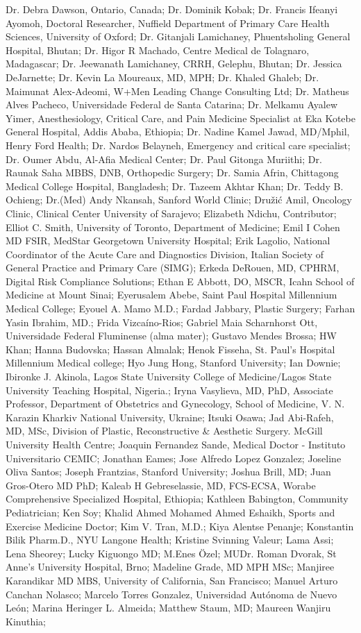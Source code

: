 Dr. Debra Dawson, Ontario, Canada; Dr. Dominik Kobak; Dr. Francis Ifeanyi Ayomoh, Doctoral Researcher, Nuffield Department of Primary Care Health Sciences, University of Oxford; Dr. Gitanjali Lamichaney, Phuentsholing General Hospital, Bhutan; Dr. Higor R Machado, Centre Medical de Tolagnaro, Madagascar; Dr. Jeewanath Lamichaney, CRRH, Gelephu, Bhutan; Dr. Jessica DeJarnette; Dr. Kevin La Moureaux, MD, MPH; Dr. Khaled Ghaleb; Dr. Maimunat Alex-Adeomi, W+Men Leading Change Consulting Ltd; Dr. Matheus Alves Pacheco, Universidade Federal de Santa Catarina; Dr. Melkamu Ayalew Yimer, Anesthesiology, Critical Care, and Pain Medicine Specialist at Eka Kotebe General Hospital, Addis Ababa, Ethiopia; Dr. Nadine Kamel Jawad, MD/Mphil, Henry Ford Health; Dr. Nardos Belayneh, Emergency and critical care specialist; Dr. Oumer Abdu, Al-Afia Medical Center; Dr. Paul Gitonga Muriithi; Dr. Raunak Saha MBBS, DNB, Orthopedic Surgery; Dr. Samia Afrin, Chittagong Medical College Hospital, Bangladesh; Dr. Tazeem Akhtar Khan; Dr. Teddy B. Ochieng; Dr.(Med) Andy Nkansah, Sanford World Clinic; Družić Amil, Oncology Clinic, Clinical Center University of Sarajevo; Elizabeth Ndichu, Contributor; Elliot C. Smith, University of Toronto, Department of Medicine; Emil I Cohen MD FSIR, MedStar Georgetown University Hospital; Erik Lagolio, National Coordinator of the Acute Care and Diagnostics Division, Italian Society of General Practice and Primary Care (SIMG); Erkeda DeRouen, MD, CPHRM, Digital Risk Compliance Solutions; Ethan E Abbott, DO, MSCR, Icahn School of Medicine at Mount Sinai; Eyerusalem Abebe, Saint Paul Hospital Millennium Medical College; Eyouel A. Mamo M.D.; Fardad Jabbary, Plastic Surgery; Farhan Yasin Ibrahim, MD.; Frida Vizcaíno-Rios; Gabriel Maia Scharnhorst Ott, Universidade Federal Fluminense (alma mater); Gustavo Mendes Brossa; HW Khan; Hanna Budovska; Hassan Almalak; Henok Fisseha, St. Paul's Hospital Millennium Medical college; Hyo Jung Hong, Stanford University; Ian Downie; Ibironke J. Akinola, Lagos State University College of Medicine/Lagos State University Teaching Hospital, Nigeria.; Iryna Vasylieva, MD, PhD, Associate Professor, Department of Obstetrics and Gynecology, School of Medicine, V. N. Karazin Kharkiv National University, Ukraine; Itsuki Osawa; Jad Abi-Rafeh, MD, MSc, Division of Plastic, Reconstructive \& Aesthetic Surgery. McGill University Health Centre; Joaquin Fernandez Sande, Medical Doctor - Instituto Universitario CEMIC; Jonathan Eames; Jose Alfredo Lopez Gonzalez; Joseline Oliva Santos; Joseph Frantzias, Stanford University; Joshua Brill, MD; Juan Gros-Otero MD PhD; Kaleab H Gebreselassie, MD, FCS-ECSA, Worabe Comprehensive Specialized Hospital, Ethiopia; Kathleen Babington, Community Pediatrician; Ken Soy; Khalid Ahmed Mohamed Ahmed Eshaikh, Sports and Exercise Medicine Doctor; Kim V. Tran, M.D.; Kiya Alentse Penanje; Konstantin Bilik Pharm.D., NYU Langone Health; Kristine Svinning Valeur; Lama Assi; Lena Sheorey; Lucky Kiguongo MD; M.Enes Özel; MUDr. Roman Dvorak, St Anne's University Hospital, Brno; Madeline Grade, MD MPH MSc; Manjiree Karandikar MD MBS, University of California, San Francisco; Manuel Arturo Canchan Nolasco; Marcelo Torres Gonzalez, Universidad Autónoma de Nuevo León; Marina Heringer L. Almeida; Matthew Staum, MD; Maureen Wanjiru Kinuthia; 